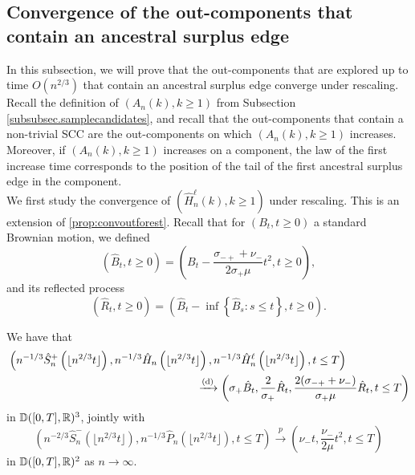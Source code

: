 \subsection{Convergence of the out-components that contain an ancestral surplus edge}\label{subsec.ancestral}
In this subsection, we will prove that the out-components that are explored up to time $O(n^{2/3})$ that contain an ancestral surplus edge converge under rescaling. Recall the definition of $(A_n(k),k\geq 1)$ from Subsection \ref{subsubsec.samplecandidates}, and recall that the out-components that contain a non-trivial SCC are the out-components on which $(A_n(k),k\geq 1)$ increases. Moreover, if $(A_n(k),k\geq 1)$ increases on a component, the law of the first increase time corresponds to the position of the tail of the first ancestral surplus edge in the component. \\
We first study the convergence of $(\hat{H}_n^\ell(k),k\geq 1)$ under rescaling. This is an extension of \cref{prop:convoutforest}. Recall that for $(B_t, t\geq 0)$ a standard  Brownian motion, we defined
$$(\hat{B}_t,t\geq 0)=\left( B_t-\frac{\sigma_{-+}+\nu_-}{2\sigma_+ \mu}t^2, t\geq 0\right),$$ 
and its reflected process
$$(\hat{R}_t,t\geq 0)=\left(\hat{B}_t-\inf\left\{\hat{B}_s: s\leq t\right\},t\geq 0\right).$$ 
\begin{proposition}
\label{prop:heightprocesswithlengths}
We have that
\begin{align*}
    &\left(n^{-1/3}\hat{S}^{+}_n\left(\lfloor n^{2/3}t\rfloor \right),n^{-1/3}\hat{H}_{n}\left(\lfloor n^{2/3}t\rfloor \right),n^{-1/3}\hat{H}^\ell_{n}\left(\lfloor n^{2/3}t\rfloor \right),  t\leq T\right)\\
    &\hspace{17em} \todist\left(\sigma_+ \hat{B}_t, \frac{2}{\sigma_+} \hat{R}_t,\frac{2(\sigma_{-+}+\nu_-)}{\sigma_+\mu} \hat{R}_t, t\leq T\right)
\end{align*}
in ${\mathbb D}([0,T],{\mathbb R})^3$,
jointly with 
$$\left(n^{-2/3}\hat{S}_n^-\left(\lfloor n^{2/3}t\rfloor \right), n^{-1/3}\hat{P}_n\left(\lfloor n^{2/3}t\rfloor \right),t\leq T\right)\overset{p}{\to}\left(\nu_-t,  \frac{\nu_-}{2\mu} t^2, t\leq T\right)$$
in ${\mathbb D}([0,T],{\mathbb R})^2$ as $n\to \infty$.
\end{proposition}
